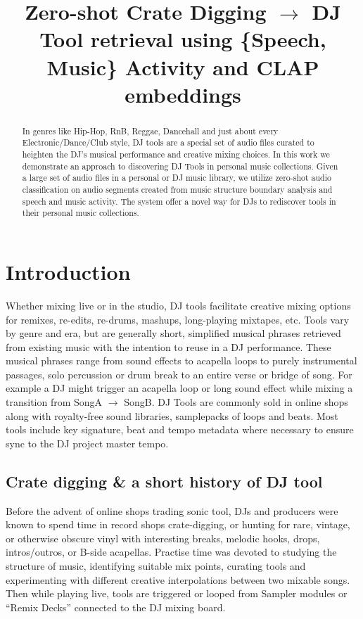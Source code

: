\documentclass{article}
\title{Zero-shot Crate Digging $\rightarrow$ DJ Tool retrieval using \{Speech, Music\} Activity and CLAP embeddings}
\begin{document}
%
\maketitle
%
\begin{abstract}
In genres like Hip-Hop, RnB, Reggae, Dancehall and just about every Electronic/Dance/Club style, DJ tools are a special set of audio files curated to heighten the DJ's musical performance and creative mixing choices. In this work we demonstrate an approach to discovering DJ Tools in personal music collections. Given a large set of audio files in a personal or DJ music library, we utilize zero-shot audio classification on audio segments created from music structure boundary analysis and speech and music activity. The system offer a novel way for DJs to rediscover tools in their personal music collections.
 \end{abstract}
%
\section{Introduction}\label{sec:introduction}
Whether mixing live or in the studio, DJ tools facilitate creative mixing options for remixes, re-edits, re-drums, mashups, long-playing mixtapes, etc. Tools vary by genre and era, but are generally short, simplified musical phrases retrieved from existing music with the intention to reuse in a DJ performance. These musical phrases range from sound effects to acapella loops to purely instrumental passages, solo percussion or drum break to an entire verse or bridge of song. For example a DJ might trigger an acapella loop or long sound effect while mixing a transition from SongA $\rightarrow$ SongB. DJ Tools are commonly sold in online shops along with royalty-free sound libraries, samplepacks of loops and beats. Most tools include key signature, beat and tempo metadata where necessary to ensure sync to the DJ project master tempo.

\subsection{Crate digging \& a short history of DJ tool}\label{sec:history}

Before the advent of online shops trading sonic tool, DJs and producers were known to spend time in record shops crate-digging, or hunting for rare, vintage, or otherwise obscure vinyl with interesting breaks, melodic hooks, drops, intros/outros, or B-side acapellas. Practise time was devoted to studying the structure of music, identifying suitable mix points, curating tools and experimenting with different creative interpolations between two mixable songs. Then while playing live, tools are triggered or looped from Sampler modules or ``Remix Decks'' connected to the DJ mixing board.
\end{document}
